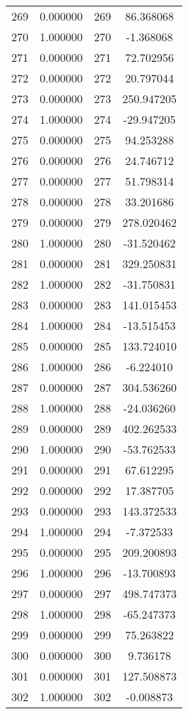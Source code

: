 \documentclass[12pt]{article}
\begin{document}
\begin{longtable}{@{}cccc@{}}
269 & 0.000000 & 269 & 86.368068 \\
270 & 1.000000 & 270 & -1.368068 \\
271 & 0.000000 & 271 & 72.702956 \\
272 & 0.000000 & 272 & 20.797044 \\
273 & 0.000000 & 273 & 250.947205 \\
274 & 1.000000 & 274 & -29.947205 \\
275 & 0.000000 & 275 & 94.253288 \\
276 & 0.000000 & 276 & 24.746712 \\
277 & 0.000000 & 277 & 51.798314 \\
278 & 0.000000 & 278 & 33.201686 \\
279 & 0.000000 & 279 & 278.020462 \\
280 & 1.000000 & 280 & -31.520462 \\
281 & 0.000000 & 281 & 329.250831 \\
282 & 1.000000 & 282 & -31.750831 \\
283 & 0.000000 & 283 & 141.015453 \\
284 & 1.000000 & 284 & -13.515453 \\
285 & 0.000000 & 285 & 133.724010 \\
286 & 1.000000 & 286 & -6.224010 \\
287 & 0.000000 & 287 & 304.536260 \\
288 & 1.000000 & 288 & -24.036260 \\
289 & 0.000000 & 289 & 402.262533 \\
290 & 1.000000 & 290 & -53.762533 \\
291 & 0.000000 & 291 & 67.612295 \\
292 & 0.000000 & 292 & 17.387705 \\
293 & 0.000000 & 293 & 143.372533 \\
294 & 1.000000 & 294 & -7.372533 \\
295 & 0.000000 & 295 & 209.200893 \\
296 & 1.000000 & 296 & -13.700893 \\
297 & 0.000000 & 297 & 498.747373 \\
298 & 1.000000 & 298 & -65.247373 \\
299 & 0.000000 & 299 & 75.263822 \\
300 & 0.000000 & 300 & 9.736178 \\
301 & 0.000000 & 301 & 127.508873 \\
302 & 1.000000 & 302 & -0.008873 \\

\end{longtable}
\end{document}
